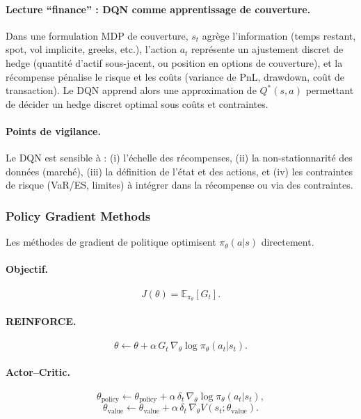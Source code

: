 \documentclass[11pt,a4paper]{article}
\newcommand{\1}{\mathbf{1}}
\begin{document}
\paragraph{Lecture ``finance'' : DQN comme apprentissage de couverture.}
Dans une formulation MDP de couverture, $s_t$ agr\`ege l'information (temps restant, spot, vol implicite, greeks, etc.),
l'action $a_t$ repr\'esente un ajustement discret de hedge (quantit\'e d'actif sous-jacent, ou position en options de couverture),
et la r\'ecompense p\'enalise le risque et les co\^uts (variance de PnL, drawdown, co\^ut de transaction).
Le DQN apprend alors une approximation de $Q^*(s,a)$ permettant de d\'ecider un hedge discret optimal sous co\^uts et contraintes.

\paragraph{Points de vigilance.}
Le DQN est sensible \`a : (i) l'\'echelle des r\'ecompenses, (ii) la non-stationnarit\'e des donn\'ees (march\'e), (iii) la d\'efinition de l'\'etat
et des actions, et (iv) les contraintes de risque (VaR/ES, limites) \`a int\'egrer dans la r\'ecompense ou via des contraintes.

\subsubsection{Policy Gradient Methods}

Les méthodes de gradient de politique optimisent $\pi_\theta(a|s)$ directement.

\paragraph{Objectif.}
\[
J(\theta) = \mathbb{E}_{\pi_\theta}[G_t].
\]

\paragraph{REINFORCE.}
\[
\theta \leftarrow \theta
+ \alpha\, G_t\, \nabla_\theta \log \pi_\theta(a_t|s_t).
\]

\paragraph{Actor--Critic.}
\[
\theta_{\mathrm{policy}} \leftarrow
\theta_{\mathrm{policy}}
+ \alpha\, \delta_t\, \nabla_\theta \log \pi_\theta(a_t|s_t),
\]
\[
\theta_{\mathrm{value}} \leftarrow
\theta_{\mathrm{value}}
+ \alpha\, \delta_t\, \nabla_\theta V(s_t;\theta_{\mathrm{value}}).
\]
\end{document}
